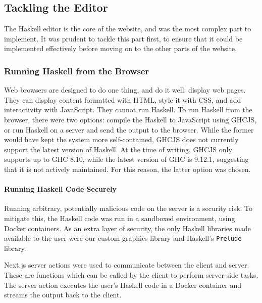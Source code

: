 \documentclass[../main.tex]{subfiles}
\begin{document}
        \subsection{Tackling the Editor}
            The Haskell editor is the core of the website, and was the most complex part to
                implement.
            It was prudent to tackle this part first, to ensure that it could be
                implemented effectively before moving on to the other parts of the website.

            \subsubsection{Running Haskell from the Browser}
                Web browsers are designed to do one thing, and do it well: display web pages.
                They can display content formatted with HTML, style it with CSS, and add
                    interactivity with JavaScript.
                They cannot run Haskell.
                To run Haskell from the browser, there were two options: compile the Haskell to
                    JavaScript using GHCJS, or run Haskell on a server and send the output to the
                    browser.
                While the former would have kept the system more self-contained, GHCJS does not
                    currently support the latest version of Haskell.
                At the time of writing, GHCJS only supports up to GHC 8.10, while the latest
                    version of GHC is 9.12.1, suggesting that it is not actively maintained.
                For this reason, the latter option was chosen.

                \paragraph{Running Haskell Code Securely}
                    Running arbitrary, potentially malicious code on the server is a security risk.
                    To mitigate this, the Haskell code was run in a sandboxed environment, using
                        Docker containers.
                    As an extra layer of security, the only Haskell libraries made available to the
                        user were our custom graphics library and Haskell's \texttt{Prelude} library.

                    Next.js server actions were used to communicate between the client and server.
                    These are functions which can be called by the client to perform server-side
                        tasks.
                    The server action executes the user's Haskell code in a Docker container and
                        streams the output back to the client.
\end{document}
